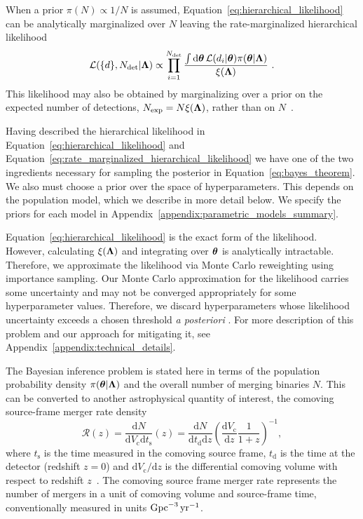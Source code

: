 When a prior $\pi(N)\propto 1/N$ is assumed, Equation~\eqref{eq:hierarchical_likelihood} can be analytically marginalized over $N$ leaving the rate-marginalized hierarchical likelihood
\begin{equation}
    \mathcal{L}(\{d\},\Ndet|\PEhyperparam) \propto \prod_{i=1}^{\Ndet}\frac{\int \mathrm{d}\PEparameter \, \mathcal{L}(d_i|\PEparameter)\pi(\PEparameter|\PEhyperparam)}{\xi(\PEhyperparam)}\ .
    \label{eq:rate_marginalized_hierarchical_likelihood}
\end{equation}
This likelihood may also be obtained by marginalizing over a prior on the expected number of detections, $N_{\rm exp} = N\xi(\boldsymbol{\Lambda})$, rather than on $N$~\citep{Essick:2023upv}.

Having described the hierarchical likelihood in Equation~\eqref{eq:hierarchical_likelihood} and Equation~\eqref{eq:rate_marginalized_hierarchical_likelihood} we have one of the two ingredients necessary for sampling the posterior in Equation~\eqref{eq:bayes_theorem}.
We also must choose a prior over the space of hyperparameters. This depends on the population model, which we describe in more detail below. We specify the priors for each model in Appendix~\ref{appendix:parametric_models_summary}.

Equation~\eqref{eq:hierarchical_likelihood} is the exact form of the likelihood. However, calculating $\xi({\boldsymbol{\Lambda}})$ and integrating over $\boldsymbol{\theta}$ is analytically intractable.
Therefore, we approximate the likelihood via Monte Carlo reweighting using importance sampling.
Our Monte Carlo approximation for the likelihood carries some uncertainty and may not be converged appropriately for some hyperparameter values. Therefore, we discard hyperparameters whose likelihood uncertainty exceeds a chosen threshold \textit{a posteriori} \citep{Talbot:2023pex}.
For more description of this problem and our approach for mitigating it, see Appendix~\ref{appendix:technical_details}.

The Bayesian inference problem is stated here in terms of the population probability density $\pi(\boldsymbol{\theta}|\boldsymbol{\Lambda})$ and the overall number of merging binaries $N$. 
This can be converted to another astrophysical quantity of interest, the comoving source-frame merger rate density
\begin{equation}
    \mathcal{R}(z) = \frac{\mathrm{d}N}{\mathrm{d}V_\mathrm{c} \mathrm{d}t_\mathrm{s}}(z) = \frac{\mathrm{d}N}{\mathrm{d}t_\mathrm{d}\mathrm{d}z}\left(\frac{\mathrm{d}V_\mathrm{c}}{\mathrm{d}z}\frac{1}{1+z}\right)^{-1},
    \label{eq:comoving_merger_rate}
\end{equation}
where $t_\mathrm{s}$ is the time measured in the comoving source frame, $t_\mathrm{d}$ is the time at the detector (redshift $z=0$) and ${\mathrm{d}V_\mathrm{c}}/{\mathrm{d}z}$ is the differential comoving volume with respect to redshift $z$~\citep[see e.g.,][]{Essick:2025zed}.
The comoving source frame merger rate represents the number of mergers in a unit of comoving volume and source-frame time, conventionally measured in units $\mathrm{Gpc}^{-3}\,\mathrm{yr}^{-1}$. 

